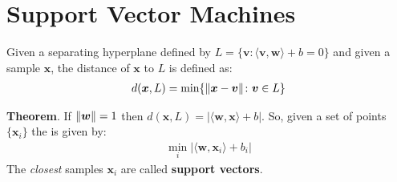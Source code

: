 \documentclass[../template.tex]{subfiles}
\begin{document}
\section{Support Vector Machines}
Given a separating hyperplane defined by $L = \{\bm{v}\colon \langle \bm{v}, \bm{w} \rangle + b = 0\}$ and given a sample $\bm{x}$, the distance of $\bm{x}$ to $L$ is defined as:
\begin{align*}
    d(\bm{x}, L ) = \min \{\norm{\bm{x}- \bm{v}} \colon \bm{v} \in L\}
\end{align*}    

\textbf{Theorem}. If $\norm{\bm{w}} = 1$ then $d(\bm{x}, L) = |\langle \bm{w, \bm{x}}  \rangle + b|$. So, given a set of points $\{\bm{x}_i\}$ the  is given by:
\begin{align*}
    \min_i |\langle \bm{w}, \bm{x}_i \rangle + b_i|
\end{align*}
The \textit{closest} samples $\bm{x}_i$ are called \textbf{support vectors}.
\end{document}
